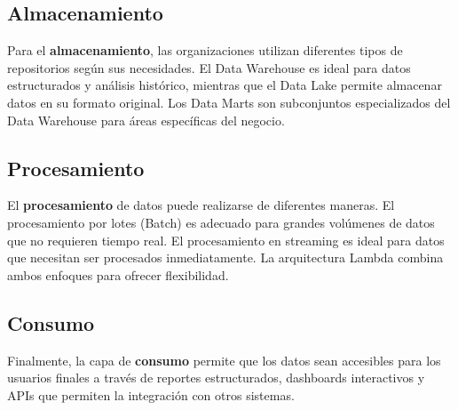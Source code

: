 \documentclass[12pt]{article}
\begin{document}
\subsection{Almacenamiento}
Para el \textbf{almacenamiento}, las organizaciones utilizan diferentes tipos de repositorios según sus necesidades. El Data Warehouse es ideal para datos estructurados y análisis histórico, mientras que el Data Lake permite almacenar datos en su formato original. Los Data Marts son subconjuntos especializados del Data Warehouse para áreas específicas del negocio.

\subsection{Procesamiento}
El \textbf{procesamiento} de datos puede realizarse de diferentes maneras. El procesamiento por lotes (Batch) es adecuado para grandes volúmenes de datos que no requieren tiempo real. El procesamiento en streaming es ideal para datos que necesitan ser procesados inmediatamente. La arquitectura Lambda combina ambos enfoques para ofrecer flexibilidad.

\subsection{Consumo}
Finalmente, la capa de \textbf{consumo} permite que los datos sean accesibles para los usuarios finales a través de reportes estructurados, dashboards interactivos y APIs que permiten la integración con otros sistemas.
\end{document}

